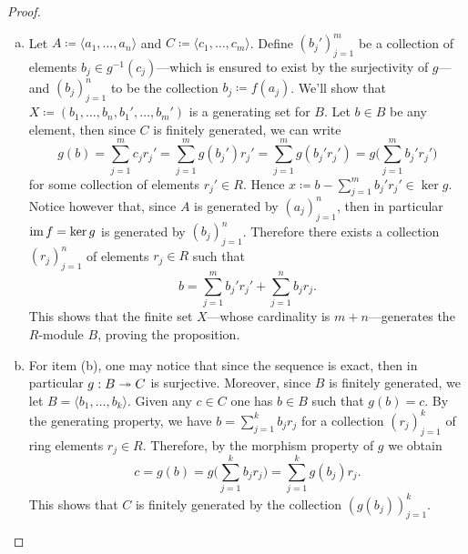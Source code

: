 \begin{proof}
    \begin{enumerate}[(a)]\setlength\itemsep{0em}
        \item Let \(A \coloneq \langle a_1, \dots, a_n \rangle\) and
              \(C \coloneq \langle c_1, \dots, c_m \rangle\). Define \((b_j')_{j=1}^m\) be a
              collection of elements \(b_j \in g^{-1}(c_j)\)---which is ensured to exist by
              the surjectivity of \(g\)---and \((b_j)_{j=1}^n\) to be the collection
              \(b_j \coloneq f(a_j)\). We'll show that
              \(X \coloneq (b_1, \dots, b_n, b_1', \dots, b_m')\) is a generating set for
              \(B\). Let \(b \in B\) be any element, then since \(C\) is finitely generated,
              we can write
              \[
                  g(b) = \sum_{j=1}^m c_j r_j'
                  = \sum_{j=1}^m g(b_j') r_j'
                  = \sum_{j=1}^m g(b_j' r_j')
                  = g\Big(\sum_{j=1}^m b_j' r_j' \Big)
              \]
              for some collection of elements \(r_j' \in R\). Hence
              \(x \coloneq b - \sum_{j=1}^m b_j' r_j' \in \ker g\). Notice however that,
              since \(A\) is generated by \((a_j)_{j=1}^n\), then in particular
              \(\operatorname{im} f = \ker g\) is generated by \((b_j)_{j=1}^n\). Therefore there exists a
              collection \((r_j)_{j=1}^n\) of elements \(r_j \in R\) such that
              \[
                  b = \sum_{j=1}^m b_j' r_j' + \sum_{j=1}^n b_j r_j.
              \]
              This shows that the finite set \(X\)---whose cardinality is
              \(m + n\)---generates the \(R\)-module \(B\), proving the proposition.

        \item For item (b), one may notice that since the sequence is exact, then in
              particular \(g: B \twoheadrightarrow C\) is surjective. Moreover, since \(B\) is finitely
              generated, we let \(B = \langle b_1, \dots, b_k \rangle\). Given any
              \(c \in C\) one has \(b \in B\) such that \(g(b) = c\). By the generating
              property, we have \(b = \sum_{j=1}^k b_j r_j\) for a collection
              \((r_j)_{j=1}^k\) of ring elements \(r_j \in R\). Therefore, by the morphism
              property of \(g\) we obtain
              \[
                  c = g(b) = g\Big(\sum_{j=1}^k b_j r_j \Big) = \sum_{j=1}^k g(b_j) r_j.
              \]
              This shows that \(C\) is finitely generated by the collection
              \((g(b_j))_{j=1}^k\).
    \end{enumerate}
\end{proof}

